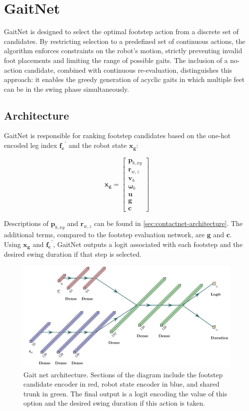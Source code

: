 \section{GaitNet}

GaitNet is designed to select the optimal footstep action from a
discrete set of candidates. By restricting selection to a predefined
set of continuous actions, the algorithm enforces constraints on the
robot’s motion, strictly preventing invalid foot placements and
limiting the range of possible gaits. The inclusion of a no-action
candidate, combined with continuous re-evaluation, distinguishes this
approach: it enables the greedy generation of acyclic gaits in which
multiple feet can be in the swing phase simultaneously.

\subsection{Architecture}

GaitNet is responsible for ranking footstep candidates based on the
one-hot encoded leg index $\mathbf{f_c}^{\prime}$ and the robot state
$\mathbf{x_g}$:

\[
  \mathbf{x_g} =
  \begin{bmatrix}
    \mathbf p_{b,xy} \\
    \mathbf r_{w,z} \\
    \mathbf v_b \\
    \mathbf \omega_b \\
    \mathbf u \\
    \mathbf g \\
    \mathbf c
  \end{bmatrix}
\]

Descriptions of $\mathbf p_{b,xy}$ and $\mathbf r_{w,z}$ can be found
in \autoref{sec:contactnet-architecture}. The additional terms,
compared to the footstep evaluation network, are $\mathbf g$ and
$\mathbf c$. Using $\mathbf{x_g}$ and $\mathbf{f_c}^{\prime}$,
GaitNet outputs a logit associated with each footstep and the desired
swing duration if that step is selected.

\begin{figure}[H]
  \centering
  \includegraphics[width=0.625\linewidth]{images/diagrams/gait-network-architecture.png}
  \caption{Gait net architecture. Sections of the diagram include the
    footstep candidate encoder in red,     robot state encoder in blue,
    and shared trunk in green.     The final output is a logit encoding
    the value of this option and the   desired swing duration if this
  action is taken.}
  \label{fig:diagram-gaitnet-architecture}
\end{figure}

